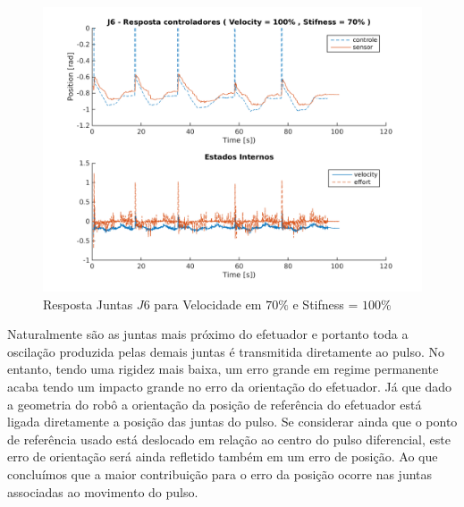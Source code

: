 \vspace{1cm}

\begin{figure}[H]
    \centering
    \includegraphics[width=0.6\linewidth,trim={2cm 1cm 2cm 2cm}]{tex/figs/squareStiffJ9stateEval_J6v100s70.png}
    \caption{Resposta Juntas $J6$ para Velocidade em $70\%$ e Stifness = $100\%$ }
    \label{fig:squareStiffJ9stateEval_J6v100s70}
\end{figure}

Naturalmente são as juntas mais próximo do efetuador e portanto toda a oscilação produzida pelas demais juntas é transmitida diretamente ao pulso. No entanto, tendo uma rigidez mais baixa, um erro grande em regime permanente acaba tendo um impacto grande no erro da orientação do efetuador. Já que dado a geometria do robô a orientação da posição de referência do efetuador está ligada diretamente a posição das juntas do pulso. Se considerar ainda que o ponto de referência usado está deslocado em relação ao centro do pulso diferencial, este erro de orientação será ainda refletido também em um erro de posição. Ao que concluímos que a maior contribuição para o erro da posição ocorre nas juntas associadas ao movimento do pulso.

%          

%          


